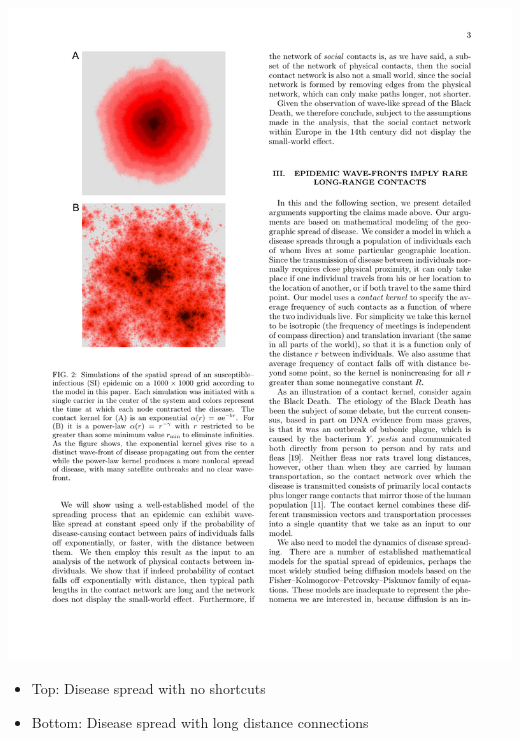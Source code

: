 \documentclass[aspectratio=169]{beamer}
\begin{document}
\begin{frame}

\begin{center}
\includegraphics[height = 0.8\textheight]{figures/marvel_small-world_2013_fig2}
\end{center}

\vfill

\begin{itemize}
\item Top: Disease spread with no shortcuts
\item Bottom: Disease spread with long distance connections
\end{itemize}


\end{frame}
\end{document}
